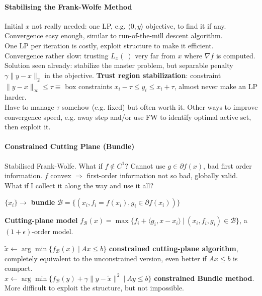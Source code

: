 \documentclass[10pt]{report}
\begin{document}
\paragraph{Stabilising the Frank-Wolfe Method} Initial $x$ not really needed: one LP, e.g. $\langle 0,y\rangle$ objective, to find it if any.\\
Convergence easy enough, similar to run-of-the-mill descent algorithm.\\
One LP per iteration is costly, exploit structure to make it efficient.\\
Convergence rather slow: trusting $L_x(\:)$ very far from $x$ where $\nabla f$ is computed.\\
Solution seen already: stabilize the master problem, but separable penalty $\gamma\|y-x\|_2$ in the objective. \textbf{Trust region stabilization}: constraint $\|y-x\|_\infty \leq \tau\equiv$ box constraints $x_i-\tau\leq y_i\leq x_i+\tau$, almost never make an LP harder.\\
Have to manage $\tau$ somehow (e.g. fixed) but often worth it. Other ways to improve convergence speed, e.g. away step and/or use FW to identify optimal active set, then exploit it.
\paragraph{Constrained Cutting Plane (Bundle)} Stabilised Frank-Wolfe. What if $f\not\in C^1$? Cannot use $g\in\partial f(x)$, bad first order information. $f$ convex $\Rightarrow$ first-order information not so bad, globally valid.\\
What if I collect it along the way and use it all?
\begin{list}{}{}
	\item $\{x_i\}\rightarrow$ \textbf{bundle} $\mathscr{B}=\{(x_i, f_i = f(x_i), g_i\in\partial f(x_i))\}$
	\item \textbf{Cutting-plane model} $f_\mathscr{B}(x) = \max\{f_i+\langle g_i, x-x_i\rangle\:|\:(x_i, f_i, g_i)\in \mathscr{B}\}$, a $(1+\epsilon)$-order model.
\end{list}
$\tilde{x}\leftarrow \arg\min\{f_\mathscr{B}(x)\:|\:Ax\leq b\}$ \textbf{constrained cutting-plane algorithm}, completely equivalent to the unconstrained version, even better if $Ax\leq b$ is compact.\\
$x\leftarrow \arg\min\{f_\mathscr{B}(y)+\gamma\|y-\tilde{x}\|^2\:|\:Ay\leq b\}$ \textbf{constrained Bundle method}.\\
More difficult to exploit the structure, but not impossible.
\end{document}
